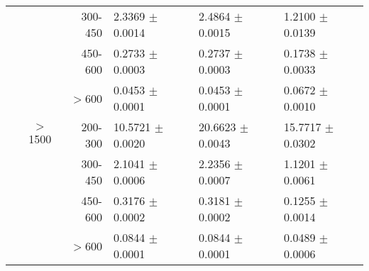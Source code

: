 \documentclass[11pt]{amsart}
\begin{document}
\begin{table}[htdp]
\begin{center}
\begin{tabular}{|c|c|r|l|l|l|}
  	&				& 300-450 & 	2.3369 $\pm$ 0.0014  & 	2.4864 $\pm$ 0.0015  & 	1.2100 $\pm$ 0.0139 \\
  	&				& 450-600 & 	0.2733 $\pm$ 0.0003  & 	0.2737 $\pm$ 0.0003  & 	0.1738 $\pm$ 0.0033 \\
  	&				& $>$600 & 	0.0453 $\pm$ 0.0001  & 	0.0453 $\pm$ 0.0001  & 	0.0672 $\pm$ 0.0010 \\
  	& $>$1500 	& 200-300 & 	10.5721 $\pm$ 0.0020  & 	20.6623 $\pm$ 0.0043  & 	15.7717 $\pm$ 0.0302 \\
  	&				& 300-450 & 	2.1041 $\pm$ 0.0006  & 	2.2356 $\pm$ 0.0007  & 	1.1201 $\pm$ 0.0061 \\
  	&				& 450-600 & 	0.3176 $\pm$ 0.0002  & 	0.3181 $\pm$ 0.0002  & 	0.1255 $\pm$ 0.0014 \\
  	&				& $>$600 & 	0.0844 $\pm$ 0.0001  & 	0.0844 $\pm$ 0.0001  & 	0.0489 $\pm$ 0.0006 \\
\hline
\end{tabular}
\end{center}
\label{default}
\end{table}%
\end{document}
